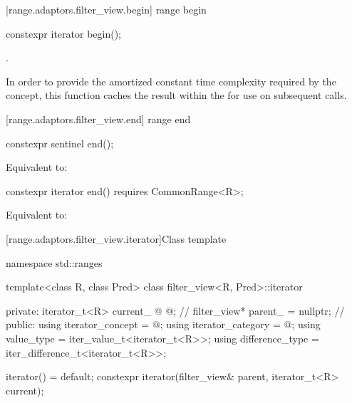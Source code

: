 \begin{addedblock}
[range.adaptors.filter_view.begin]{ range begin}

%
\begin{itemdecl}
constexpr iterator begin();
\end{itemdecl}

\begin{itemdescr}
\pnum
\returns
{}.

\pnum
\remarks In order to provide the amortized constant time complexity required by
the  concept, this function caches the result within the
 for use on subsequent calls.
\end{itemdescr}

[range.adaptors.filter_view.end]{ range end}

%
\begin{itemdecl}
constexpr sentinel end();
\end{itemdecl}

\begin{itemdescr}
\pnum
\effects Equivalent to: 
\end{itemdescr}

\begin{itemdecl}
constexpr iterator end() requires CommonRange<R>;
\end{itemdecl}

\begin{itemdescr}
\pnum
\effects Equivalent to: 
\end{itemdescr}

[range.adaptors.filter_view.iterator]{Class template }

%
\begin{codeblock}
namespace std::ranges {
  template<class R, class Pred>
  class filter_view<R, Pred>::iterator {
  private:
    iterator_t<R> current_ @\oldtxt{\{\}} @;           // \expos
    filter_view* parent_ = nullptr;      // \expos
  public:
    using iterator_concept  = @\seebelownc@;
    using iterator_category = @\seebelownc@;
    using value_type        = iter_value_t<iterator_t<R>>;
    using difference_type   = iter_difference_t<iterator_t<R>>;

    iterator() = default;
    constexpr iterator(filter_view& parent, iterator_t<R> current);

}}
\end{codeblock}
\end{addedblock}
